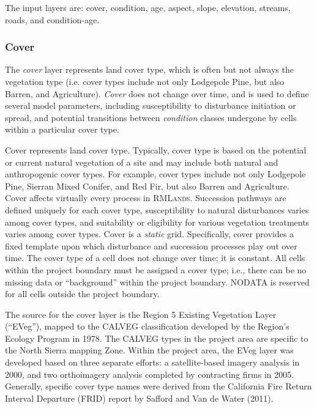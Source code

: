 The input layers are: cover, condition, age, aspect, slope, elevation, streams, roads, and condition-age.


\subsubsection{Cover} The \emph{cover} layer represents land cover type, which is often but not always the vegetation type (i.e. cover types include not only Lodgepole Pine, but also Barren, and Agriculture). \emph{Cover} does not change over time, and is used to define several model parameters, including susceptibility to disturbance initiation or spread, and potential transitions between \emph{condition} classes undergone by cells within a particular cover type.

Cover represents land cover type. Typically, cover type is based on the potential or current natural vegetation of a site and may include both natural and anthropogenic cover types. For example, cover types include not only Lodgepole Pine, Sierran Mixed Conifer, and Red Fir, but also Barren and Agriculture. Cover affects virtually every process in \textsc{RMLands}. Succession pathways are defined uniquely for each cover type, susceptibility to natural disturbances varies among cover types, and suitability or eligibility for various vegetation treatments varies among cover types. Cover is a \emph{static} grid. Specifically, cover provides a fixed template upon which disturbance and succession processes play out over time. The cover type of a cell does not change over time; it is constant. All cells within the project boundary must be assigned a cover type; i.e., there can be no missing data or ``background'' within the project boundary. NODATA is reserved for all cells outside the project boundary.

The source for the cover layer is the Region 5 Existing Vegetation Layer (``EVeg''), mapped to the CALVEG classification developed by the Region's Ecology Program in 1978. The CALVEG types in the project area are specific to the North Sierra mapping Zone. Within the project area, the EVeg layer was developed based on three separate efforts: a satellite-based imagery analysis in 2000, and two orthoimagery analysis completed by contracting firms in 2005. Generally, specific cover type names were derived from the California Fire Return Interval Departure (FRID) report by Safford and Van de Water (2011).

